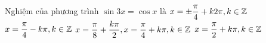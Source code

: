 \begin{ex}%
	Nghiệm của phương trình $\sin 3x = \cos x$ là 
	\choice
	{$x = \pm \dfrac{\pi}{4} + k2\pi, k \in \Bbb{Z}$}
	{$x = \dfrac{\pi}{4} - k\pi, k \in \Bbb{Z}$}
	{\True $x = \dfrac{\pi}{8} + \dfrac{k\pi}{2}, x= \dfrac{\pi}{4} + k \pi,  k \in \Bbb{Z}$}
	{$x = \dfrac{\pi}{2} + k\pi, k \in \Bbb{Z}$}
\end{ex}